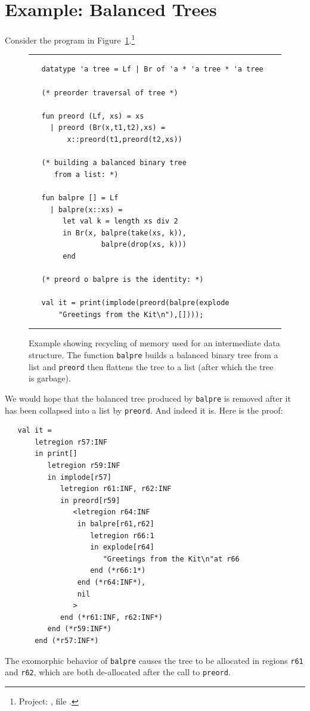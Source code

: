 \documentclass[12pt]{book}
\begin{document}
\section{Example: Balanced Trees}
Consider the program in Figure~\ref{balpre.fig}.\footnote{Project:
  , file .}
\begin{figure} 
\hrule 
\medskip
\begin{verbatim}
   datatype 'a tree = Lf | Br of 'a * 'a tree * 'a tree

   (* preorder traversal of tree *)

   fun preord (Lf, xs) = xs
     | preord (Br(x,t1,t2),xs) = 
         x::preord(t1,preord(t2,xs))

   (* building a balanced binary tree 
      from a list: *)

   fun balpre [] = Lf
     | balpre(x::xs) = 
        let val k = length xs div 2
        in Br(x, balpre(take(xs, k)),
                 balpre(drop(xs, k)))
        end

   (* preord o balpre is the identity: *)

   val it = print(implode(preord(balpre(explode 
       "Greetings from the Kit\n"),[])));
\end{verbatim}
\caption{Example showing recycling of memory used for an intermediate 
  data structure. The function {\tt balpre} builds a balanced binary
  tree from a list and {\tt preord} then flattens the tree to a list
  (after which the tree is garbage).}  
\medskip \hrule
\label{balpre.fig}
\end{figure}
We would hope that the balanced tree produced by {\tt balpre} is
removed after it has been collapsed into a list by {\tt preord}.  And
indeed it is. Here is the proof:
\begin{verbatim}
   val it = 
       letregion r57:INF 
       in print[] 
          letregion r59:INF 
          in implode[r57] 
             letregion r61:INF, r62:INF 
             in preord[r59] 
                <letregion r64:INF 
                 in balpre[r61,r62] 
                    letregion r66:1 
                    in explode[r64] 
                       "Greetings from the Kit\n"at r66 
                    end (*r66:1*) 
                 end (*r64:INF*), 
                 nil
                > 
             end (*r61:INF, r62:INF*) 
          end (*r59:INF*) 
       end (*r57:INF*)
\end{verbatim}
The exomorphic behavior of {\tt balpre} causes the tree to be
allocated in regions {\tt r61} and {\tt r62}, which are both
de-allocated after the call to {\tt preord}.
\end{document}
